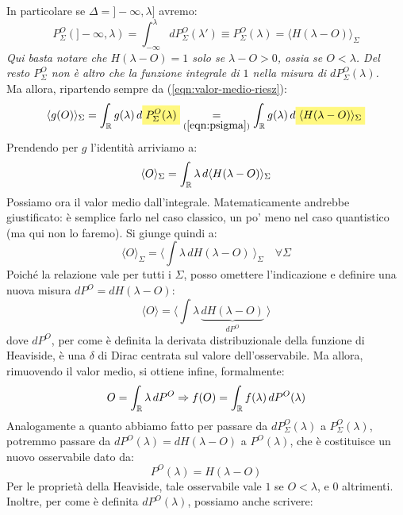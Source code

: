 \documentclass[FisicaTeorica.tex]{subfiles}
\begin{document}
In particolare se $\Delta= ]-\infty, \lambda]$ avremo:
\begin{equation}
P_\Sigma^O(]-\infty,\lambda) = \int_{-\infty}^\lambda dP_\Sigma^O(\lambda') \equiv P_\Sigma^O(\lambda) = \langle H(\lambda-O)\rangle_\Sigma
\label{eqn:psigma}
\end{equation}
\textit{Qui basta notare che $H(\lambda-O) = 1$ solo se $\lambda-O>0$, ossia se $O < \lambda$. Del resto $P_\Sigma^O$ non è altro che la funzione integrale di $1$ nella misura di $dP_\Sigma^O(\lambda)$.}\\
Ma allora, ripartendo sempre da (\ref{eqn:valor-medio-riesz}):
\[
\langle g(O) \rangle_\Sigma = \int_\bb{R} g(\lambda)\, d\hlc{Yellow}{P_\Sigma^O(\lambda)} \underset{(\ref{eqn:psigma})}{=} \int_\bb{R} g(\lambda)\, d\hlc{Yellow}{\langle H(\lambda-O)\rangle_\Sigma}
\]
Prendendo per $g$ l'identità arriviamo a:
\begin{equation}
\langle O \rangle_\Sigma = \int_{\mathbb{R}} \lambda\, d\langle H(\lambda-O)\rangle_\Sigma
\label{eqn:Omedio}
\end{equation}
Possiamo ora  il valor medio dall'integrale. Matematicamente andrebbe giustificato: è semplice farlo nel caso classico, un po' meno nel caso quantistico (ma qui non lo faremo). Si giunge quindi a:
\[
\langle O \rangle_\Sigma = \langle \int \lambda\, dH(\lambda-O) \> \rangle_\Sigma\quad \forall \Sigma
\]
Poiché la relazione vale per tutti i $\Sigma$, posso omettere l'indicazione e definire una nuova misura $dP^O = dH(\lambda-O)$:
\[
\langle O \rangle = \langle \int \lambda \, \underbrace{dH(\lambda-O)}_{dP^O} \> \rangle
\]
dove $dP^O$, per come è definita la derivata distribuzionale della funzione di Heaviside, è una $\delta$ di Dirac centrata sul valore dell'osservabile. Ma allora, rimuovendo il valor medio, si ottiene infine, formalmente:
\begin{equation}
O = \int_{\mathbb{R}} \lambda\, dP^O \Rightarrow f(O) = \int_{\mathbb{R}} f(\lambda)\, dP^O(\lambda)
\label{eqn:osservabileformale}
\end{equation}
Analogamente a quanto abbiamo fatto per passare da $dP_\Sigma^O(\lambda)$ a $P_\Sigma^O(\lambda)$, potremmo passare da $dP^O(\lambda) = dH(\lambda-O)$ a $P^O(\lambda)$, che è costituisce un nuovo osservabile dato da:
\begin{equation}
P^O(\lambda) = H(\lambda-O)
\label{eqn:POdef}
\end{equation}
Per le proprietà della Heaviside, tale osservabile vale $1$ se $O < \lambda$, e $0$ altrimenti.
Inoltre, per come è definita $dP^O(\lambda)$, possiamo anche scrivere:
\end{document}
